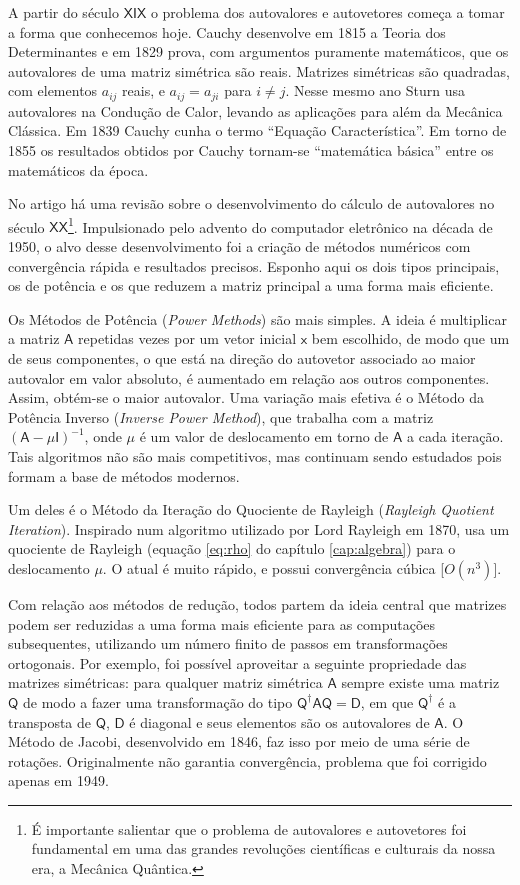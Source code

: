 	A partir do século $\mathsf{XIX}$ o problema dos autovalores e autovetores começa a tomar a forma que conhecemos hoje. Cauchy desenvolve em 1815 a Teoria dos Determinantes e em 1829 prova, com argumentos puramente matemáticos, que os autovalores de uma matriz simétrica são reais. Matrizes simétricas são quadradas, com elementos $a_{ij}$ reais, e $a_{ij} = a_{ji}$ para $i \neq j$. Nesse mesmo ano Sturn usa autovalores na Condução de Calor, levando as aplicações para além da Mecânica Clássica. Em 1839 Cauchy cunha o termo ``Equação Característica''. Em torno de 1855 os resultados obtidos por Cauchy tornam-se ``matemática básica'' entre os matemáticos da época.
	
	No artigo \cite{autovaloresSecXX} há uma revisão sobre o desenvolvimento do cálculo de autovalores no século $\mathsf{XX}$\footnote{É importante salientar que o problema de autovalores e autovetores foi fundamental em uma das grandes revoluções científicas e culturais da nossa era, a Mecânica Quântica.}. Impulsionado pelo advento do computador eletrônico na década de 1950, o alvo desse desenvolvimento foi a criação de métodos numéricos com convergência rápida e resultados precisos. Esponho aqui os dois tipos principais, os de potência e os que reduzem a matriz principal a uma forma mais eficiente.
	
	Os Métodos de Potência (\emph{Power Methods}) são mais simples. A ideia é multiplicar a matriz $\mathsf{A}$ repetidas vezes por um vetor inicial $\mathsf{x}$ bem escolhido, de modo que um de seus componentes, o que está na direção do autovetor associado ao maior autovalor em valor absoluto, é aumentado em relação aos outros componentes. Assim, obtém-se o maior autovalor. Uma variação mais efetiva é o Método da Potência Inverso (\emph{Inverse Power Method}), que trabalha com a matriz $(\mathsf{A} - \mu \mathsf{I})^{-1}$, onde $\mu$ é um valor de deslocamento em torno de $\mathsf{A}$ a cada iteração. Tais algoritmos não são mais competitivos, mas continuam sendo estudados pois formam a base de métodos modernos.
	
	Um deles é o Método da Iteração do Quociente de Rayleigh (\emph{Rayleigh Quotient Iteration}). Inspirado num algoritmo utilizado por Lord Rayleigh em 1870, usa um quociente de Rayleigh (equação \ref{eq:rho} do capítulo \ref{cap:algebra}) para o deslocamento $\mu$. O atual é muito rápido, e possui convergência cúbica [$O(n^3)$].
		
	Com relação aos métodos de redução, todos partem da ideia central que matrizes podem ser reduzidas a uma forma mais eficiente para as computações subsequentes, utilizando um número finito de passos em transformações ortogonais. Por exemplo, foi possível aproveitar a seguinte propriedade das matrizes simétricas: para qualquer matriz simétrica $\mathsf{A}$ sempre existe uma matriz $\mathsf{Q}$ de modo a fazer uma transformação do tipo $\mathsf{Q}^{\dag} \mathsf{A} \mathsf{Q} = \mathsf{D}$, em que $\mathsf{Q}^{\dag}$ é a transposta de $\mathsf{Q}$, $\mathsf{D}$ é diagonal e seus elementos são os autovalores de $\mathsf{A}$. O Método de Jacobi, desenvolvido em 1846, faz isso por meio de uma série de rotações. Originalmente não garantia convergência, problema que foi corrigido apenas em 1949.
	
